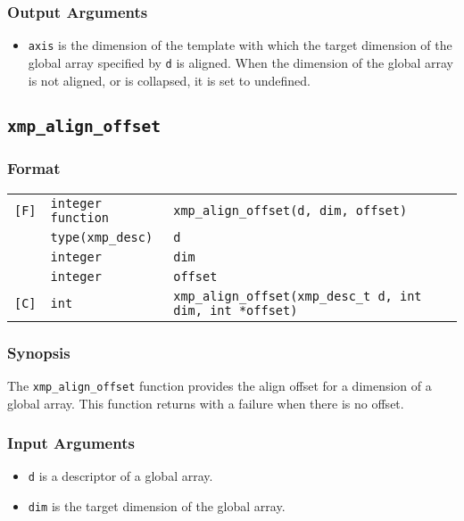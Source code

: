 \subsubsection*{Output Arguments}
\begin{itemize}
 \item {\tt axis} is the dimension of the template with which the target
       dimension of the global array specified by {\tt d} is
       aligned. When the dimension of the global array is not aligned,
       or is collapsed, it is set to undefined.
\end{itemize}


\subsection{\tt xmp\_align\_offset}

\subsubsection*{Format}

\begin{tabular}{lll}

\verb![F]!& {\tt integer function}& {\tt xmp\_align\_offset(d, dim, offset)}\\
          & {\tt type(xmp\_desc)} & {\tt d}\\
          & {\tt integer} & {\tt dim}\\
          & {\tt integer} & {\tt offset}\\

\verb![C]!&  {\tt int}& {\tt xmp\_align\_offset(xmp\_desc\_t d, int dim, int *offset)}\\

\end{tabular}

\subsubsection*{Synopsis}

The {\tt xmp\_align\_offset} function provides the align offset for a
dimension of a global array. This function returns with a failure when
there is no offset.

\subsubsection*{Input Arguments}
\begin{itemize}
 \item {\tt d} is a descriptor of a global array.
 \item {\tt dim} is the target dimension of the global array.
\end{itemize}

